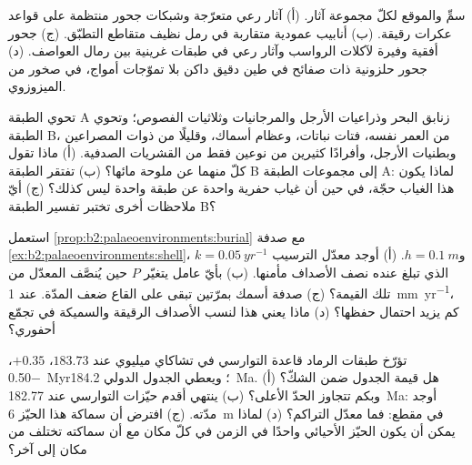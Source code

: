 \begin{exercise}[$\star$]\label{exo:b2:palaeoenvironments:3}
سمِّ  والموقع لكلّ مجموعة آثار. (أ) آثار رعي متعرّجة وشبكات جحور منتظمة
على قواعد عكرات رقيقة. (ب) أنابيب عمودية متقاربة في رمل نظيف
متقاطع التطبّق. (ج) جحور أفقية وفيرة لآكلات الرواسب وآثار رعي في طبقات
غرينية بين رمال العواصف. (د) جحور حلزونية ذات صفائح في طين دقيق داكن بلا تموّجات
أمواج، في صخور من الميزوزوي.
\end{exercise}

\begin{exercise}[$\star$]\label{exo:b2:palaeoenvironments:4}
تحوي الطبقة A زنابق البحر وذراعيات الأرجل والمرجانيات وثلاثيات الفصوص؛ وتحوي الطبقة B، من العمر نفسه، فتات
نباتات، وعظام أسماك، وقليلًا من ذوات المصراعين وبطنيات الأرجل، وأفرادًا كثيرين من نوعين فقط من
القشريات الصدفية. (أ) ماذا تقول كلّ منهما عن ملوحة مائها؟ (ب) تفتقر الطبقة B إلى مجموعات
الطبقة A: لماذا يكون هذا الغياب حجّة، في حين أن غياب حفرية واحدة عن طبقة واحدة ليس كذلك؟
(ج) أيّ ملاحظات أخرى تختبر تفسير الطبقة B؟
\end{exercise}

\begin{exercise}[$\star\star$]\label{exo:b2:palaeoenvironments:5}
استعمل \cref{prop:b2:palaeoenvironments:burial} مع صدفة
\cref{ex:b2:palaeoenvironments:shell}، $k = \qty{0.05}{yr^{-1}}$ و$h = \qty{0.1}{m}$. (أ)
أوجد معدّل الترسيب الذي تبلغ عنده نصف الأصداف مأمنها. (ب) بأيّ عامل يتغيّر $P$
حين يُنصَّف المعدّل من تلك القيمة؟ (ج) صدفة أسمك بمرّتين تبقى على القاع ضعف
المدّة. عند \qty{1}{mm.yr^{-1}}، كم يزيد احتمال حفظها؟ (د) ماذا
يعني هذا لنسب الأصداف الرقيقة والسميكة في تجمّع أحفوري؟
\end{exercise}

\begin{exercise}[$\star\star$]\label{exo:b2:palaeoenvironments:6}
تؤرّخ طبقات الرماد قاعدة التوارسي في تشاكاي ميليوي عند $183.73$، $+0.35$، \qty{-0.50}{Myr}؛
ويعطي الجدول الدولي \qty{184.2}{Ma}. (أ) هل قيمة الجدول ضمن الشكّ؟
وبكم تتجاوز الحدّ الأعلى؟ (ب) ينتهي أقدم حيّزات التوارسي عند
\qty{182.77}{Ma}: أوجد مدّته. (ج) افترض أن سماكة هذا الحيّز \qty{6}{m} في مقطع:
فما معدّل التراكم؟ (د) لماذا يمكن أن يكون الحيّز الأحيائي واحدًا في الزمن في كلّ مكان مع أن
سماكته تختلف من مكان إلى آخر؟
\end{exercise}

